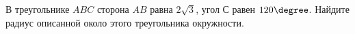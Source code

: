 \begin{ex}
	\begin{condition}
		В треугольнике \( ABC  \) сторона \( AB  \) равна \( 2\sqrt{3} \), угол \( С \)  равен \( 120\degree\). Найдите радиус описанной около этого треугольника окружности.
	\end{condition}
\end{ex}